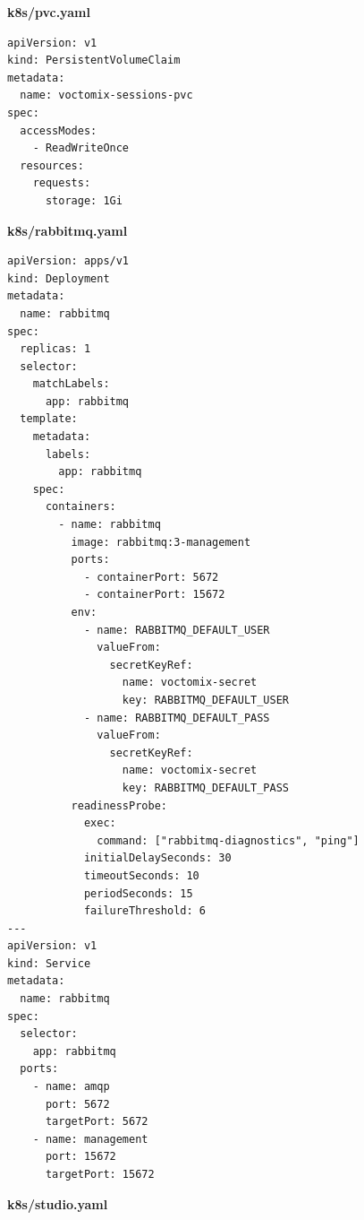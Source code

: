 \vspace{0.3cm}
\noindent\textbf{\small k8s/pvc.yaml}
\vspace{0.1cm}

\begin{lstlisting}[style=codefile, morecomment={[l]{\#}}]
apiVersion: v1
kind: PersistentVolumeClaim
metadata:
  name: voctomix-sessions-pvc
spec:
  accessModes:
    - ReadWriteOnce
  resources:
    requests:
      storage: 1Gi
\end{lstlisting}

\vspace{0.3cm}
\noindent\textbf{\small k8s/rabbitmq.yaml}
\vspace{0.1cm}

\begin{lstlisting}[style=codefile, morecomment={[l]{\#}}]
apiVersion: apps/v1
kind: Deployment
metadata:
  name: rabbitmq
spec:
  replicas: 1
  selector:
    matchLabels:
      app: rabbitmq
  template:
    metadata:
      labels:
        app: rabbitmq
    spec:
      containers:
        - name: rabbitmq
          image: rabbitmq:3-management
          ports:
            - containerPort: 5672
            - containerPort: 15672
          env:
            - name: RABBITMQ_DEFAULT_USER
              valueFrom:
                secretKeyRef:
                  name: voctomix-secret
                  key: RABBITMQ_DEFAULT_USER
            - name: RABBITMQ_DEFAULT_PASS
              valueFrom:
                secretKeyRef:
                  name: voctomix-secret
                  key: RABBITMQ_DEFAULT_PASS
          readinessProbe:
            exec:
              command: ["rabbitmq-diagnostics", "ping"]
            initialDelaySeconds: 30
            timeoutSeconds: 10
            periodSeconds: 15
            failureThreshold: 6
---
apiVersion: v1
kind: Service
metadata:
  name: rabbitmq
spec:
  selector:
    app: rabbitmq
  ports:
    - name: amqp
      port: 5672
      targetPort: 5672
    - name: management
      port: 15672
      targetPort: 15672
\end{lstlisting}

\clearpage
\noindent\textbf{\small k8s/studio.yaml}
\vspace{0.1cm}

